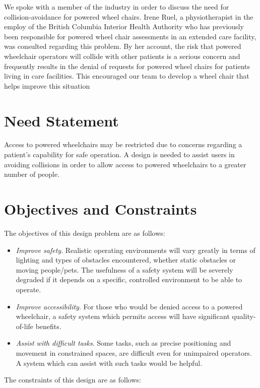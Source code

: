 \documentclass[oneside,final,a4paper]{report}
\begin{document}
We spoke with a member of the industry in order to discuss the need for collision-avoidance for powered wheel chairs. Irene Ruel, a physiotherapist in the employ of the British Columbia Interior Health Authority who has previously been responsible for powered wheel chair assessments in an extended care facility, was consulted regarding this problem. By her account, the risk that powered wheelchair operators will collide with other patients is a serious concern and frequently results in the denial of requests for powered wheel chairs for patients living in care facilities. This encouraged our team to develop a wheel chair that helps improve this situation

\section{Need Statement}
Access to powered wheelchairs may be restricted due to concerns regarding a patient's capability for safe operation. A design is needed to assist users in avoiding collisions in order to allow access to powered wheelchairs to a greater number of people.

\section{Objectives and Constraints}
The objectives of this design problem are as follows:

\begin{itemize}
 \item \emph{Improve safety}.  Realistic operating environments will vary greatly in terms of lighting and types of obstacles encountered, whether static obstacles or moving people/pets. The usefulness of a safety system will be severely degraded if it depends on a specific, controlled environment to be able to operate.
 \item \emph{Improve accessibility}.  For those who would be denied access to a powered wheelchair, a safety system which permits access will have significant quality-of-life benefits.
 \item \emph{Assist with difficult tasks}. Some tasks, such as precise positioning and movement in constrained spaces, are difficult even for unimpaired operators.   A system which can assist with such tasks would be helpful.
\end{itemize}

The constraints of this design are as follows:
\end{document}

